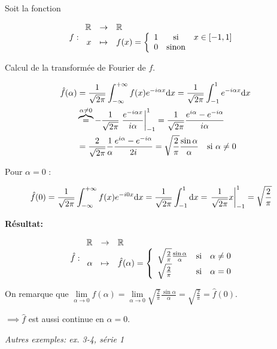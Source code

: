 \begin{example}
    Soit la fonction 
    
    \[
    f:
    \begin{array}{r c l}
    \mathbb{R} & \rightarrow & \mathbb{R} \\
    x  & \mapsto & f(x) = 
    \left \{
    \begin{array}{r c l}
    1 & \textrm{si} & x \in [-1, 1] \\
    0   & \textrm{sinon} &
    \end{array}
    \right.
    \end{array}
    \]
    
    Calcul de la transformée de Fourier de $f$.
    
    \begin{align*}
    \hat{f}(\alpha) & =
    \frac{1}{\sqrt{2 \pi}}
    \int_{-\infty}^{+\infty}
    f(x)
    e^{-i \alpha x}
    \mathrm{d}x
    =
    \frac{1}{\sqrt{2 \pi}}
    \int_{-1}^{1}
    e^{-i \alpha x}
    \mathrm{d}x
    \\&\overbrace{=}^{\alpha \neq 0}
    -
    \frac{1}{\sqrt{2 \pi}}
    \left.
    \frac{e^{-i \alpha x}}{i \alpha}
    \right|_{-1}^{1}
    =
    \frac{1}{\sqrt{2 \pi}}
    \frac{e^{i \alpha} - e^{-i \alpha}}{i \alpha}
    \\&=
    \frac{2}{\sqrt{2 \pi}}
    \frac{1}{\alpha}
    \frac{e^{i \alpha} - e^{-i \alpha}}{2i}
    =
    \sqrt{\frac{2}{\pi}}
    \frac{\sin \alpha}{\alpha}
    \quad
    \text{si } \alpha \neq 0
    \end{align*}
    
    Pour $\alpha = 0$ :
    
    \begin{align*}
    \hat{f}(0) &=
    \frac{1}{\sqrt{2 \pi}}
    \int_{-\infty}^{+\infty}
    f(x)
    e^{-i 0 x}
    \mathrm{d}x
    =
    \frac{1}{\sqrt{2 \pi}}
    \int_{-1}^{1}
    \mathrm{d}x
    =
    \left.
    \frac{1}{\sqrt{2 \pi}}
    x
    \right|_{-1}^{1}
    =
    \sqrt{\frac{2}{\pi}}
    \end{align*}
    
    \textbf{Résultat:}
    
    \[
    \hat{f}:
    \begin{array}{r c l}
    \mathbb{R} & \rightarrow & \mathbb{R} \\
    \alpha & \mapsto & \hat{f}(\alpha) =
    \left\{
    \begin{array}{l c l}
    \sqrt{\frac{2}{\pi}}
    \frac{\sin \alpha}{\alpha} & \mathrm{si} & \alpha \neq 0\\
    \sqrt{\frac{2}{\pi}} & \mathrm{si} & \alpha = 0
    \end{array}
    \right.
    \end{array}
    \]
    
    On remarque que $\lim\limits_{\alpha \rightarrow 0} \hat{f}(\alpha) = \lim\limits_{\alpha \rightarrow 0} \sqrt{\frac{2}{\pi}} \frac{\sin \alpha}{\alpha} = \sqrt{\frac{2}{\pi}} = \hat{f}(0)$.
    
    $\implies \hat{f}$ est aussi continue en $\alpha = 0$.
    
    \textit{Autres exemples: ex. 3-4, série 1}
    
\end{example}



